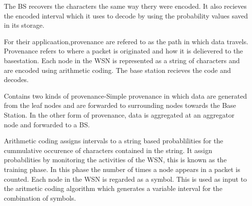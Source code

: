 The BS recovers the characters the same way thery were encoded. It also recieves the encoded interval which it uses to decode by using the probability values saved in its storage.



For their applicaation,provenance are refered to as the path in which data travels. Provenance refers to where a packet is originated and how it is delievered to the basestation. Each node in the WSN is represented as a string of characters and are encoded using arithmetic coding. The base station recieves the code and decodes.

Contains two kinds of provenance-Simple provenance in which data are generated from the leaf nodes and are forwarded to surrounding nodes towards the Base Station. In the other form of provenance, data is aggregated at an aggregator node and forwarded to a BS.

Arithmetic coding assigns intervals to a string based  probablilities for the cummulative occurence of characters contained in the string. It assign probabilities by monitoring the activities of the WSN, this is known as the training phase. In this phase the number of times a node appears in a packet is counted.  Each node in the WSN is regarded as a symbol. This is used as input to the aritmetic coding algorithm which generates a variable interval for the combination of symbols.








